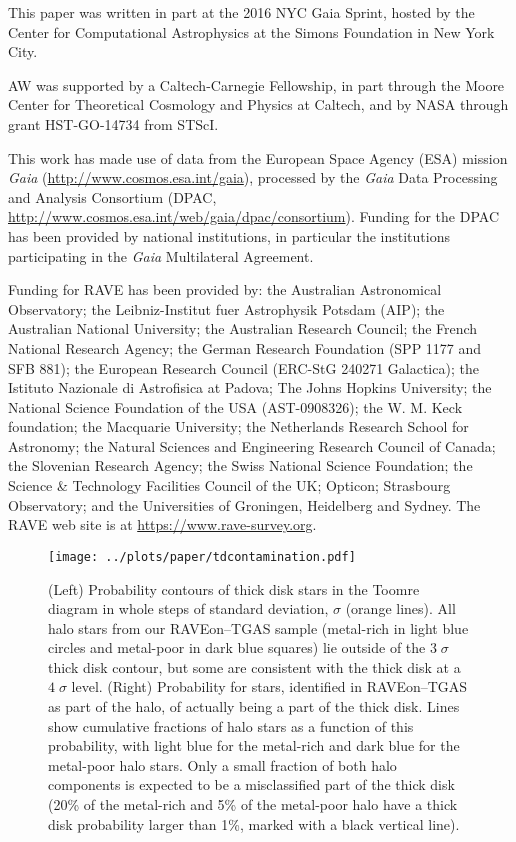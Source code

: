 \documentclass[apj, twocolappendix, numberedappendix, appendixfloats]{emulateapj}
\begin{document}
This paper was written in part at the 2016 NYC Gaia Sprint, hosted by the Center for Computational Astrophysics at the Simons Foundation in New York City.

AW was supported by a Caltech-Carnegie Fellowship, in part through the Moore Center for Theoretical Cosmology and Physics at Caltech, and by NASA through grant HST-GO-14734 from STScI.

This work has made use of data from the European Space Agency (ESA) mission {\it Gaia} (\url{http://www.cosmos.esa.int/gaia}), processed by the {\it Gaia} Data Processing and Analysis Consortium (DPAC, \url{http://www.cosmos.esa.int/web/gaia/dpac/consortium}). Funding for the DPAC has been provided by national institutions, in particular the institutions participating in the {\it Gaia} Multilateral Agreement.

Funding for RAVE has been provided by: the Australian Astronomical Observatory; the Leibniz-Institut fuer Astrophysik Potsdam (AIP); the Australian National University; the Australian Research Council; the French National Research Agency; the German Research Foundation (SPP 1177 and SFB 881); the European Research Council (ERC-StG 240271 Galactica); the Istituto Nazionale di Astrofisica at Padova; The Johns Hopkins University; the National Science Foundation of the USA (AST-0908326); the W. M. Keck foundation; the Macquarie University; the Netherlands Research School for Astronomy; the Natural Sciences and Engineering Research Council of Canada; the Slovenian Research Agency; the Swiss National Science Foundation; the Science \& Technology Facilities Council of the UK; Opticon; Strasbourg Observatory; and the Universities of Groningen, Heidelberg and Sydney.
The RAVE web site is at \url{https://www.rave-survey.org}.

\begin{figure*}
\begin{center}
\texttt{[image: ../plots/paper/tdcontamination.pdf]}
\caption{(Left) Probability contours of thick disk stars in the Toomre diagram in whole steps of standard deviation, $\sigma$ (orange lines).
All halo stars from our RAVEon--TGAS sample (metal-rich in light blue circles and metal-poor in dark blue squares) lie outside of the $3\;\sigma$ thick disk contour, but some are consistent with the thick disk at a $4\;\sigma$ level.
(Right) Probability for stars, identified in RAVEon--TGAS as part of the halo, of actually being a part of the thick disk.
Lines show cumulative fractions of halo stars as a function of this probability, with light blue for the metal-rich and dark blue for the metal-poor halo stars.
Only a small fraction of both halo components is expected to be a misclassified part of the thick disk (20\% of the metal-rich and 5\% of the metal-poor halo have a thick disk probability larger than 1\%, marked with a black vertical line).}
\label{fig:tdcont}
\end{center}
\end{figure*}
\end{document}

